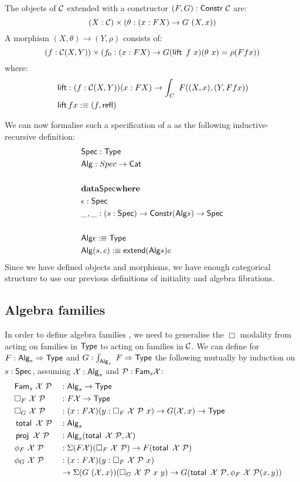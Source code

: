 \documentclass[a4paper,10pt]{article}
\begin{document}
The objects of $\mathcal{C}$ extended with a constructor $(F,G) : \mathsf{Constr}\ \mathcal{C}$ are:
$$
(X : \C) \times (\theta : (x : FX) \to G\ (X,x))
$$
A morphism $(X, \theta) \to (Y, \rho)$ consists of:
$$
(f : \mathcal{C}(X,Y)) \times (f_0 : (x : FX) \to G (\operatorname{\mathsf{lift}}\ f\ x) (\theta\ x) = \rho (F f x))
$$
where:
%
\begin{align*}
&\operatorname{\mathsf{lift}} : (f : \mathcal{C}(X,Y)) (x : FX) \to \int_{C}\ F ((X,x),(Y,Ffx)) \\
&\operatorname{\mathsf{lift}} f x :\equiv (f , \operatorname{\mathsf{refl}})
\end{align*}
%

We can now formalise such a specification of a \hit as the following
inductive-recursive definition:
%
\begin{align*}
  &\mathsf{Spec} : \mathsf{Type} \\
  &\mathsf{Alg} : Spec \to \mathsf{Cat} \\
  \\
  &{\bf data} \mathsf{Spec} {\bf where} \\
  &\epsilon : \mathsf{Spec} \\
  &\_,\_ : (s : \mathsf{Spec}) \to \mathsf{Constr} (\mathsf{Alg} s) \to \mathsf{Spec} \\
  \\
  &\mathsf{Alg} \epsilon :\equiv \mathsf{Type}\\
  &\mathsf{Alg} (s , c) :\equiv \mathsf{extend} (\mathsf{Alg} s) c
\end{align*}
%
Since we have defined objects and morphisms, we have enough
categorical structure to use our previous definitions of initiality
and algebra fibrations. 

\subsection{Algebra families}
\label{sec:algfamhits}
In order to define algebra families , we need to generalise the $\Box$
modality from acting on families in $\mathsf{Type}$ to acting on families in
$\mathcal{C}$. We can define for $F : \mathsf{Alg}_s \Rightarrow \mathsf{Type}$ and
$G : \int_{\mathsf{Alg}_s}\ F \Rightarrow \mathsf{Type}$ the following mutually by induction
on $s : \mathsf{Spec}$, assuming $\mathcal{X} : \mathsf{Alg}_s$ and
$\mathcal{P} : \mathsf{Fam}_s \mathcal{X}$:
%
\begin{alignat*}{4}
  &\Fam_s\ \alg{X} \ \algfib{P} &&: \Alg_s \to \Type&\\
  &\Box_F\ \alg{X} \ \algfib{P} &&: F \alg{X} \to \Type&\\
  &\Box_G\ \alg{X} \ \algfib{P} &&: (x : F \alg{X}) (y : \Box_F\ \alg{X} \ \algfib{P}\ x) \to G (\alg{X} , x) \to \Type&\\
  &\total\ \alg{X} \ \algfib{P} &&: \Alg_s&\\
  &\proj\ \alg{X} \ \algfib{P}  &&: \Alg_s(\total\ \alg{X}\ \algfib{P}, \alg{X})&\\
  &\phi_F\ \alg{X} \ \algfib{P} &&: \Sigma (F \alg{X}) (\Box_F\ \alg{X}\ \algfib{P}) \to F (\total\ \alg{X}\ \algfib{P})&\\
  &\phi_G\ \alg{X} \ \algfib{P} &&: (x : F \alg{X}) (y : \Box_F\ \alg{X} \ \algfib{P}\ x) &\\
  &\ \ \ \ &&\to \Sigma (G\ (\alg{X},x)) (\Box_G\ \alg{X}\ \algfib{P}\ x\ y) 
            \to G (\total\ \alg{X}\ \algfib{P}, \phi_F\ \alg{X}\ \algfib{P} (x , y)) &
\end{alignat*}
%
\end{document}
